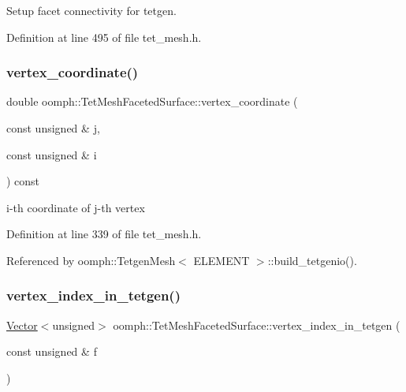 Setup facet connectivity for tetgen. 



Definition at line 495 of file tet\+\_\+mesh.\+h.

\mbox{\label{classoomph_1_1TetMeshFacetedSurface_aad7ab6940be9b8ed2e73d80c238c5128}} 
\subsubsection{\texorpdfstring{vertex\+\_\+coordinate()}{vertex\_coordinate()}}
{\footnotesize\ttfamily double oomph\+::\+Tet\+Mesh\+Faceted\+Surface\+::vertex\+\_\+coordinate (\begin{DoxyParamCaption}\item[{const unsigned \&}]{j,  }\item[{const unsigned \&}]{i }\end{DoxyParamCaption}) const\hspace{0.3cm}{\ttfamily [inline]}}



i-\/th coordinate of j-\/th vertex 



Definition at line 339 of file tet\+\_\+mesh.\+h.



Referenced by oomph\+::\+Tetgen\+Mesh$<$ E\+L\+E\+M\+E\+N\+T $>$\+::build\+\_\+tetgenio().

\mbox{\label{classoomph_1_1TetMeshFacetedSurface_a931ad8f6d1da646d06341e1c09a3d242}} 
\subsubsection{\texorpdfstring{vertex\+\_\+index\+\_\+in\+\_\+tetgen()}{vertex\_index\_in\_tetgen()}}
{\footnotesize\ttfamily \hyperlink{classoomph_1_1Vector}{Vector}$<$unsigned$>$ oomph\+::\+Tet\+Mesh\+Faceted\+Surface\+::vertex\+\_\+index\+\_\+in\+\_\+tetgen (\begin{DoxyParamCaption}\item[{const unsigned \&}]{f }\end{DoxyParamCaption})\hspace{0.3cm}{\ttfamily [inline]}}



